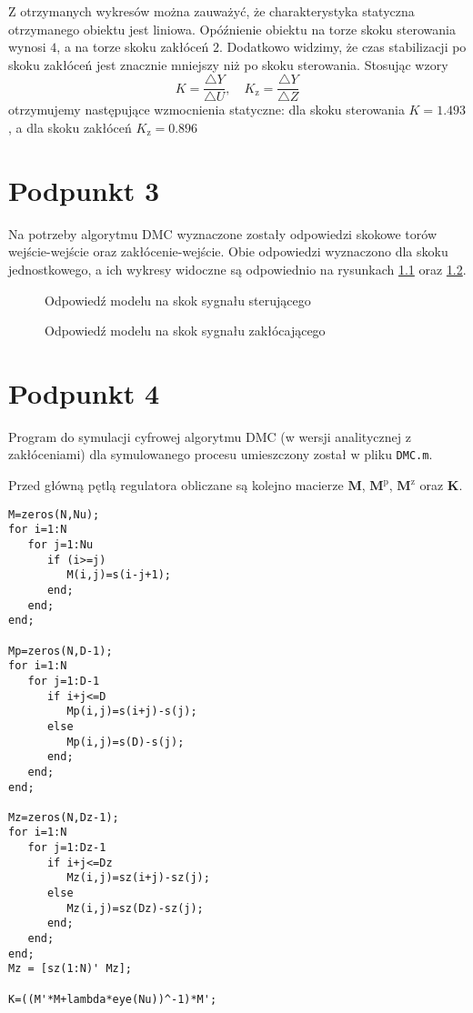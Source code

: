 Z otrzymanych wykresów można zauważyć, że charakterystyka statyczna otrzymanego obiektu jest liniowa. Opóźnienie obiektu na torze skoku sterowania wynosi $ \num{4} $, a na torze skoku zakłóceń $ \num{2} $. Dodatkowo widzimy, że czas stabilizacji po skoku zakłóceń jest znacznie mniejszy niż po skoku sterowania. Stosując wzory
\begin{equation}
K = \frac{ \triangle Y }{ \triangle U},\quad K_{\mathrm{z}} = \frac{\triangle Y}{\triangle Z}
\end{equation}
otrzymujemy następujące wzmocnienia statyczne: dla skoku sterowania $ K = \num{1,493} $, a dla skoku zakłóceń $ K_\mathrm{z} = \num{0,896} $


\chapter{Podpunkt 3}
Na potrzeby algorytmu DMC wyznaczone zostały odpowiedzi skokowe torów wejście-wejście oraz zakłócenie-wejście. Obie odpowiedzi wyznaczono dla skoku jednostkowego, a ich wykresy widoczne są odpowiednio na rysunkach \ref{Z3a} oraz \ref{Z3b}.

\begin{figure}[ht]
\centering

\caption{Odpowiedź modelu na skok sygnału sterującego}
\label{Z3a}
\end{figure}

\begin{figure}[ht]
\centering

\caption{Odpowiedź modelu na skok sygnału zakłócającego}
\label{Z3b}
\end{figure}


\chapter{Podpunkt 4}
Program do symulacji cyfrowej algorytmu DMC (w wersji analitycznej z zakłóceniami) dla symulowanego procesu umieszczony został w pliku \verb+DMC.m+.

Przed główną pętlą regulatora obliczane są kolejno macierze $ \boldsymbol{M} $, $ \boldsymbol{M}^\mathrm{p}$, $ \boldsymbol{M}^\mathrm{z} $ oraz $ \boldsymbol{K} $.


\begin{lstlisting}[style=Matlab-editor]
%generacja macierzy
M=zeros(N,Nu);
for i=1:N
   for j=1:Nu
      if (i>=j)
         M(i,j)=s(i-j+1);
      end;
   end;
end;

Mp=zeros(N,D-1);
for i=1:N
   for j=1:D-1
      if i+j<=D
         Mp(i,j)=s(i+j)-s(j);
      else
         Mp(i,j)=s(D)-s(j);
      end;
   end;
end;

Mz=zeros(N,Dz-1);
for i=1:N
   for j=1:Dz-1
      if i+j<=Dz
         Mz(i,j)=sz(i+j)-sz(j);
      else
         Mz(i,j)=sz(Dz)-sz(j);
      end;
   end;
end;
Mz = [sz(1:N)' Mz];

K=((M'*M+lambda*eye(Nu))^-1)*M';
\end{lstlisting} 


